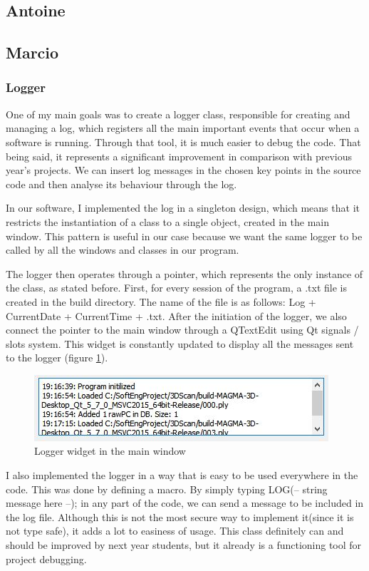 \documentclass[aps,letterpaper,11pt]{revtex4}
\begin{document}
\subsection{Antoine}
\subsection{Marcio}

\subsubsection{Logger}
One of my main goals was to create a logger class, responsible for creating and managing a log, which registers all the main important events that occur when a software is running. Through that tool, it is much easier to debug the code. That being said, it represents a significant improvement in comparison with previous year's projects. We can insert log messages in the chosen key points in the source code and then analyse its behaviour through the log.\par
In our software, I implemented the log in a singleton design, which means that it restricts the instantiation of a class to a single object, created in the main window. This pattern is useful in our case because we want the same logger to be called by all the windows and classes in our program.\par
The logger then operates through a pointer, which represents the only instance of the class, as stated before. First, for every session of the program, a .txt file is created in the build directory. The name of the file is as follows: Log + CurrentDate + CurrentTime + .txt. After the initiation of the logger, we also connect the pointer to the main window through a QTextEdit using Qt signals / slots system. This widget is constantly updated to display all the messages sent to the logger (figure \ref{fig:logger}).\par
\begin{figure}[h]
\includegraphics[scale=1]{logger_mw}
\caption{Logger widget in the main window}
\label{fig:logger}
\end{figure}

I also implemented the logger in a way that is easy to be used everywhere in the code. This was done by defining a macro. By simply typing LOG(-- string message here --); in any part of the code, we can send a message to be included in the log file. Although this is not the most secure way to implement it(since it is not type safe), it adds a lot to easiness of usage. This class definitely can and should be improved by next year students, but it already is a functioning tool for project debugging.\par
\end{document}
